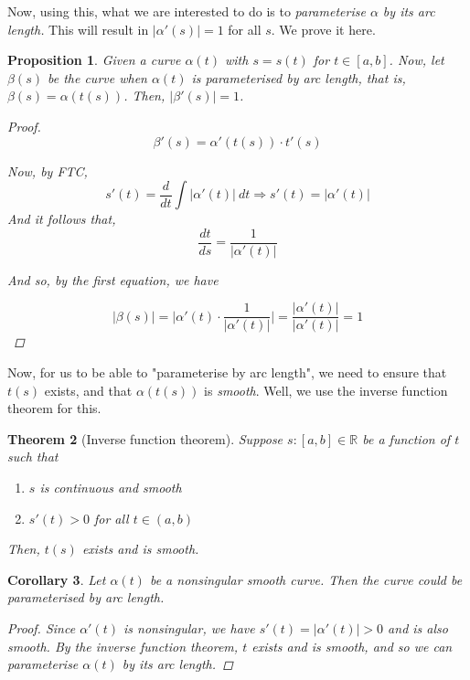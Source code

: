 \documentclass[10pt, a4paper]{article}
\theoremstyle{plain}
\newtheorem{theorem}{Theorem}[section]
\newtheorem{proposition}[theorem]{Proposition}
\newtheorem{corollary}[theorem]{Corollary}
\theoremstyle{definition}
\theoremstyle{remark}
\begin{document}
Now, using this, what we are interested to do is to \textit{parameterise $\alpha$ by its arc length.} This will result in $|\alpha'(s) | = 1$ for all $s$. We prove it here.

\begin{proposition}
    Given a curve $\alpha(t)$ with $s =s(t)$ for $t \in [a,b]$. Now, let $\beta(s)$ be the curve when $\alpha(t)$ is parameterised by arc length, that is, $\beta(s) = \alpha(t(s))$. Then, $|\beta'(s)| =1$.
    \begin{proof}
       $$\beta'(s) = \alpha'(t(s))\cdot t'(s)$$

        Now, by FTC,
        $$s'(t) = \frac{d}{dt} \int |\alpha'(t) | \ dt \Rightarrow s'(t) = |\alpha'(t)|$$
        And it follows that,
        $$\frac{dt}{ds} = \frac{1}{|\alpha'(t)|}$$

        And so, by the first equation, we have

        $$|\beta(s)| = \Bigg|\alpha'(t) \cdot \frac{1}{|\alpha'(t)|} \Bigg| =\frac{|\alpha'(t)|}{|\alpha'(t)|}=1$$
        
    \end{proof}
\end{proposition}

Now, for us to be able to "parameterise by arc length", we need to ensure that $t(s)$ exists, and that $\alpha(t(s))$ is \textit{smooth}. Well, we use the inverse function theorem for this.

\begin{theorem}[Inverse function theorem]
    Suppose $s:[a,b] \in \mathbb{R}$ be a function of $t$ such that

    \begin{enumerate}[label=(\roman*)]
        \item $s$ is continuous and smooth
        \item $s'(t) >0$ for all $t \in(a,b)$
    \end{enumerate}
    Then, $t(s)$ exists and is smooth.
\end{theorem}

\begin{corollary}
    Let $\alpha(t)$ be a nonsingular smooth curve. Then the curve could be parameterised by arc length.

    \begin{proof}
        Since $\alpha'(t)$ is nonsingular, we have $s'(t) =|\alpha'(t)| >0$ and is also smooth. By the inverse function theorem, $t$ exists and is smooth, and so we can parameterise $\alpha(t)$ by its arc length.
    \end{proof}
\end{corollary}
\end{document}
